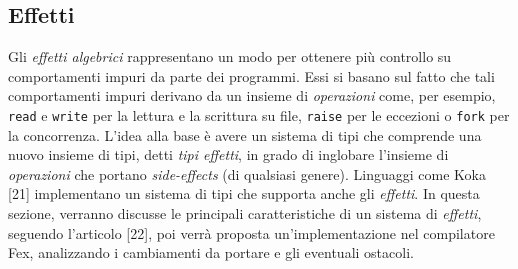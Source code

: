 \documentclass[10pt,a4paper]{article}
\begin{document}
\subsection{Effetti}
Gli \textit{effetti algebrici} rappresentano un modo per ottenere più controllo su comportamenti impuri da parte dei
programmi. Essi si basano sul fatto che tali comportamenti impuri derivano da un insieme di \textit{operazioni} come,
per esempio, \texttt{read} e \texttt{write} per la lettura e la scrittura su file, \texttt{raise} per le eccezioni o
\texttt{fork} per la concorrenza.
L'idea alla base è avere un sistema di tipi che comprende una nuovo insieme di tipi, detti \textit{tipi effetti}, in
grado di inglobare l'insieme di \textit{operazioni} che portano \textit{side-effects} (di qualsiasi genere). Linguaggi
come Koka [21] implementano un sistema di tipi che supporta anche gli \textit{effetti}. In questa sezione, verranno
discusse le principali caratteristiche di un sistema di \textit{effetti}, seguendo l'articolo [22], poi verrà proposta
un'implementazione nel compilatore Fex, analizzando i cambiamenti da portare e gli eventuali ostacoli.
\end{document}
